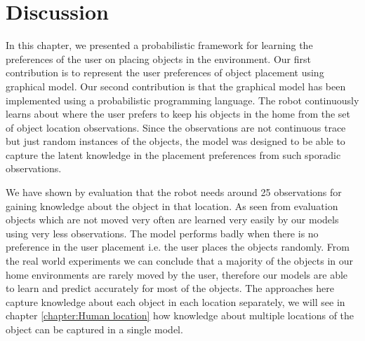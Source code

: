 \FloatBarrier
\section{Discussion}
In this chapter, we presented a probabilistic framework for learning the preferences of the user on placing objects in the environment. Our first contribution is to represent the user preferences of object placement using graphical model. Our second contribution is that the graphical model has been implemented using a probabilistic programming language. The robot continuously learns about where the user prefers to keep his objects in the home from the set of object location observations. Since the observations are not continuous trace but just random instances of the objects, the model was designed to be able to capture the latent knowledge in the placement preferences from such sporadic observations.

We have shown by evaluation that the robot needs around 25 observations for gaining knowledge about the object in that location. As seen from evaluation objects which are not moved very often are learned very easily by our models using very less observations. The model performs badly when there is no preference in the user placement i.e. the user places the objects randomly. 
From the real world experiments we can conclude that a majority of the objects in our home environments are rarely moved by the user, therefore our models are able to learn and predict accurately for most of the objects. 
The approaches here capture knowledge about each object in each location separately, we will see in chapter \ref{chapter:Human location} how knowledge about multiple locations of the object can be captured in a single model.
